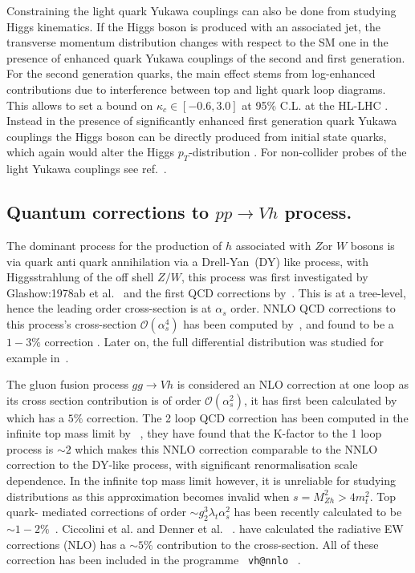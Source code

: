 \documentclass[12pt]{article}
\begin{document}
Constraining the light quark Yukawa couplings can also be done  from studying Higgs kinematics.  If the Higgs boson is produced with an associated jet, the transverse momentum distribution changes with respect to the SM one in the presence of enhanced quark Yukawa couplings of the second and first generation. For the second generation quarks, the main effect stems from log-enhanced contributions due to interference between top and light quark loop diagrams. This allows to set a bound on $\kappa_c \in [-0.6, 3.0]$  at 95\% C.L. at the HL-LHC \cite{Bishara:2016jga}. Instead in the presence of significantly enhanced first generation quark Yukawa couplings the Higgs boson can be directly produced from initial state quarks, which again would alter the Higgs $p_{T}$-distribution \cite{Soreq:2016rae}. For non-collider probes of the light Yukawa couplings see ref.~\cite{Delaunay:2016brc}.
\subsection*{ Quantum corrections to $ pp \to Vh$ process. }
\par The dominant process for the production of $h$ associated with $Z$or $W$ bosons is via quark anti quark annihilation via a Drell-Yan~(DY) like process, with Higgsstrahlung of the off shell $Z/W$, this process was first investigated by Glashow:1978ab et al.~\cite{Glashow:1978ab} and the first QCD corrections by~\cite{Han:1991ia}. This is at a tree-level, hence the leading order cross-section is at $\alpha_s$ order. NNLO QCD corrections to this process's cross-section $\mathcal O(\alpha_s^4)$  has been computed by~\cite{vanNeerven:1991gh,Brein:2003wg,Brein:2004ue}, and found to be a $ 1-3\%$ correction . Later on, the full differential distribution was studied for example in~\cite{Ferrera:2014lca}. 
\par The gluon fusion process $gg \to Vh$ is considered an NLO correction at one loop as its cross section contribution  is of order $\mathcal O(\alpha_s^2)$, it has first been calculated by~\cite{Dicus:1988yh,Kniehl:1990iva,Brein:2003wg,Brein:2004ue} which has a $5\%$ correction. The 2 loop QCD correction has been computed in the infinite top mass limit by ~\cite{Altenkamp:2012sx}, they have found that the K-factor to the 1 loop process is $\sim 2$ which makes this NNLO correction comparable to the NNLO correction to the DY-like process, with significant renormalisation scale dependence. In the  infinite top mass limit however, it is unreliable for studying distributions as this approximation becomes invalid when $ s =M_{Zh}^2 > 4m_t^2$.  Top quark- mediated corrections of order $ \sim g_2^3 \lambda_t \alpha_s^2$ has been recently calculated to be $\sim 1-2\%$~\cite{Brein:2011vx}. Ciccolini et al. and Denner et al. ~\cite{Ciccolini:2003jy,Denner:2011id,}. have calculated the radiative EW corrections (NLO) has a $\sim 5\%$ contribution to the cross-section. All of these correction has been included in the programme \texttt{ vh@nnlo} ~\cite{Brein:2012ne}.
\end{document}
